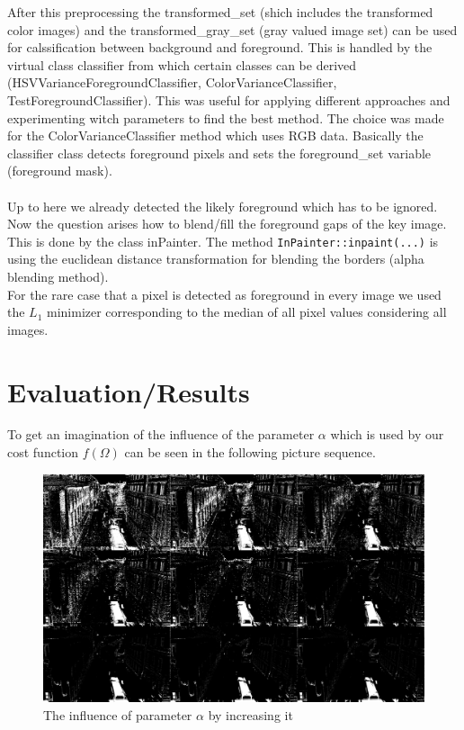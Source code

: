 After this preprocessing the transformed\_set (shich includes the transformed color images) and the transformed\_gray\_set (gray valued image set) can be used for calssification between background and foreground. This is handled by the virtual class classifier from which certain classes can be derived (HSVVarianceForegroundClassifier, ColorVarianceClassifier, TestForegroundClassifier). This was useful for applying different approaches and experimenting witch parameters to find the best method. The choice was made for the ColorVarianceClassifier method which uses RGB data. Basically the classifier class detects foreground pixels and sets the foreground\_set variable (foreground mask).\\\\

Up to here we already detected the likely foreground which has to be ignored. Now the question arises how to blend/fill the foreground gaps of the key image. This is done by the class inPainter. The method \texttt{InPainter::inpaint(...)} is using the euclidean distance transformation for blending the borders (alpha blending method).\\
For the rare case that a pixel is detected as foreground in every image we used the $L_1$ minimizer corresponding to the median of all pixel values considering all images.


\chapter{Evaluation/Results}

To get an imagination of the influence of the parameter $\alpha$ which is used by our cost function $f(\Omega)$ can be seen in the following picture sequence.

\begin{figure}[h!t]
\centering
\includegraphics[scale = 0.14]{pics/alpha.jpg}
\caption{The influence of parameter $\alpha$ by increasing it}
\label{1}
\end{figure}


